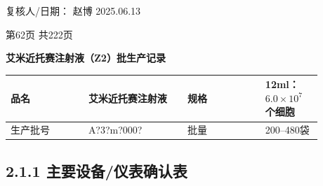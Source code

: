 \documentclass[UTF8,10pt,a4paper,fontset=fandol]{ctexart}
\newcommand{\fieldvalue}[1]{#1}
\newcommand{\handwritten}[1]{#1}
\begin{document}
\hfill
复核人/日期：
\fieldvalue{\handwritten{赵博}}
\quad
\fieldvalue{\handwritten{2025.06.13}}

\begin{center}
第62页 共222页
\end{center}

\newpage

\begin{center}
\textbf{艾米近托赛注射液（Z2）批生产记录}
\end{center}

\begin{center}
\begin{tabular}{|p{0.22\linewidth}|p{0.28\linewidth}|p{0.22\linewidth}|p{0.16\linewidth}|}
\hline
品名 &
\fieldvalue{艾米近托赛注射液} &
规格 &
\fieldvalue{12ml：$6.0\times10^{7}$个细胞}
\\ \hline
生产批号 &
\fieldvalue{\handwritten{A?3?m?000?}} &
批量 &
\fieldvalue{200--480袋}
\\ \hline
\end{tabular}
\end{center}

\subsection*{2.1.1 主要设备/仪表确认表}
\end{document}
